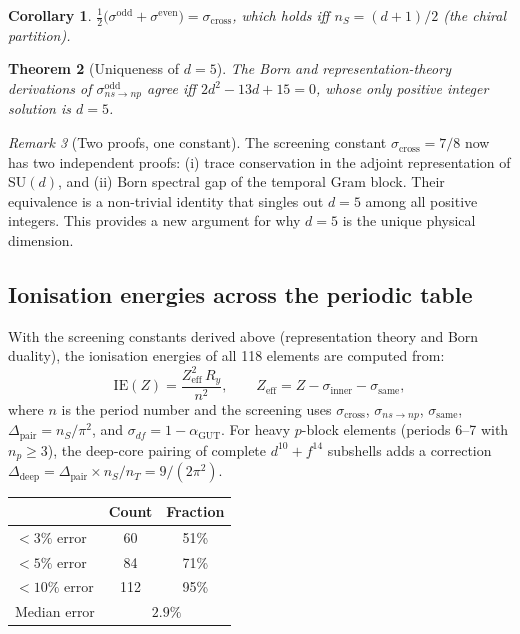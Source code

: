 \documentclass[12pt]{article}
\newtheorem{theorem}{Theorem}[section]
\newtheorem{corollary}[theorem]{Corollary}
\theoremstyle{remark}
\newtheorem{remark}[theorem]{Remark}
\theoremstyle{definition}
\begin{document}
\begin{corollary}
$\frac{1}{2}\bigl(\sigma^\text{odd} + \sigma^\text{even}\bigr) = \sigma_\text{cross}$, which holds iff $n_S = (d+1)/2$ (the chiral partition).
\end{corollary}

\begin{theorem}[Uniqueness of $d=5$]
\label{thm:d5_born}
The Born and representation-theory derivations of $\sigma_{ns\to np}^\text{odd}$ agree iff $2d^2 - 13d + 15 = 0$, whose only positive integer solution is $\boxed{d = 5}$.
\end{theorem}

\begin{remark}[Two proofs, one constant]
The screening constant $\sigma_\text{cross} = 7/8$ now has two independent proofs: (i) trace conservation in the adjoint representation of SU$(d)$, and (ii) Born spectral gap of the temporal Gram block.  Their equivalence is a non-trivial identity that singles out $d = 5$ among all positive integers.  This provides a new argument for why $d = 5$ is the unique physical dimension.
\end{remark}

\subsection{Ionisation energies across the periodic table}
\label{sec:periodic_IE}

With the screening constants derived above (representation theory and Born duality), the ionisation energies of all 118 elements are computed from:
\begin{equation}
\text{IE}(Z) = \frac{Z_\text{eff}^2\,R_y}{n^2}, \qquad Z_\text{eff} = Z - \sigma_\text{inner} - \sigma_\text{same},
\end{equation}
where $n$ is the period number and the screening uses $\sigma_\text{cross}$, $\sigma_{ns\to np}$, $\sigma_\text{same}$, $\Delta_\text{pair} = n_S/\pi^2$, and $\sigma_{df} = 1 - \alpha_\text{GUT}$.  For heavy $p$-block elements (periods 6--7 with $n_p \geq 3$), the deep-core pairing of complete $d^{10}+f^{14}$ subshells adds a correction $\Delta_\text{deep} = \Delta_\text{pair} \times n_S/n_T = 9/(2\pi^2)$.

\begin{center}
\begin{tabular}{lcc}
\hline
& Count & Fraction \\
\hline
$<3\%$ error & 60 & 51\% \\
$<5\%$ error & 84 & 71\% \\
$<10\%$ error & 112 & 95\% \\
Median error & \multicolumn{2}{c}{$2.9\%$} \\
\hline
\end{tabular}
\end{center}
\end{document}
